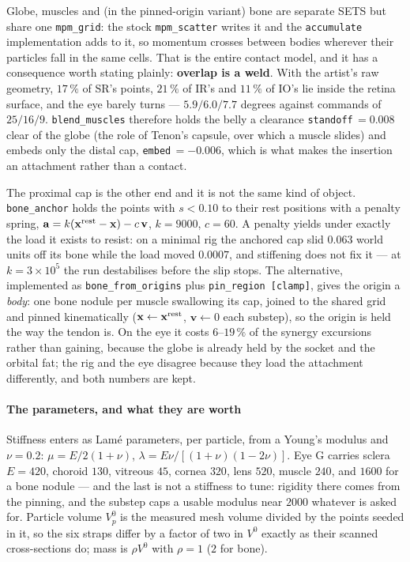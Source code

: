 \documentclass[10pt]{article}
\begin{document}
Globe, muscles and (in the pinned-origin variant) bone are separate SETS but share one
\texttt{mpm\_grid}: the stock \texttt{mpm\_scatter} writes it and the \texttt{accumulate}
implementation adds to it, so momentum crosses between bodies wherever their particles fall
in the same cells. That is the entire contact model, and it has a consequence worth stating
plainly: \textbf{overlap is a weld}. With the artist's raw geometry, $17\,\%$ of SR's
points, $21\,\%$ of IR's and $11\,\%$ of IO's lie inside the retina surface, and the eye
barely turns --- $5.9/6.0/7.7$ degrees against commands of $25/16/9$.
\texttt{blend\_muscles} therefore holds the belly a clearance \texttt{standoff}$\,=0.008$
clear of the globe (the role of Tenon's capsule, over which a muscle slides) and embeds only
the distal cap, \texttt{embed}$\,=-0.006$, which is what makes the insertion an attachment
rather than a contact.

The proximal cap is the other end and it is not the same kind of object.
\texttt{bone\_anchor} holds the points with $s<0.10$ to their rest positions with a penalty
spring, $\mathbf{a}=k(\mathbf{x}^{\rm rest}-\mathbf{x})-c\,\mathbf{v}$, $k=9000$, $c=60$. A
penalty yields under exactly the load it exists to resist: on a minimal rig the anchored cap
slid $0.063$ world units off its bone while the load moved $0.0007$, and stiffening does not
fix it --- at $k=3\times10^{5}$ the run destabilises before the slip stops. The alternative,
implemented as \texttt{bone\_from\_origins} plus \texttt{pin\_region [clamp]}, gives the
origin a \emph{body}: one bone nodule per muscle swallowing its cap, joined to the shared
grid and pinned kinematically ($\mathbf{x}\leftarrow\mathbf{x}^{\rm rest}$,
$\mathbf{v}\leftarrow0$ each substep), so the origin is held the way the tendon is. On the
eye it costs $6$--$19\,\%$ of the synergy excursions rather than gaining, because the globe
is already held by the socket and the orbital fat; the rig and the eye disagree because they
load the attachment differently, and both numbers are kept.

\paragraph{The parameters, and what they are worth}

Stiffness enters as Lamé parameters, per particle, from a Young's modulus and $\nu=0.2$:
$\mu = E/2(1+\nu)$, $\lambda = E\nu/[(1+\nu)(1-2\nu)]$. Eye G carries sclera $E=420$,
choroid $130$, vitreous $45$, cornea $320$, lens $520$, muscle $240$, and $1600$ for a bone
nodule --- and the last is not a stiffness to tune: rigidity there comes from the pinning,
and the substep caps a usable modulus near $2000$ whatever is asked for. Particle volume
$V^0_p$ is the measured mesh volume divided by the points seeded in it, so the six straps
differ by a factor of two in $V^0$ exactly as their scanned cross-sections do; mass is $\rho
V^0$ with $\rho=1$ ($2$ for bone).
\end{document}
